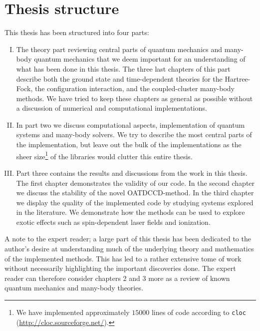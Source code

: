     \section{Thesis structure}
        This thesis has been structured into four parts:
        \begin{enumerate}[I.]
            \item The theory part reviewing central parts of quantum mechanics
                and many-body quantum mechanics that we deem important for an
                understanding of what has been done in this thesis.
                The three last chapters of this part describe both the ground
                state and time-dependent theories for the Hartree-Fock, the
                configuration interaction, and the coupled-cluster many-body
                methods.
                We have tried to keep these chapters as general as possible
                without a discussion of numerical and computational
                implementations.
            \item In part two we discuss computational aspects, implementation
                of quantum systems and many-body solvers.
                We try to describe the most central parts of the implementation,
                but leave out the bulk of the implementations as the sheer
                size\footnote{%
                    We have implemented approximately $15000$ lines of code
                    according to \texttt{cloc}
                    (\url{http://cloc.sourceforge.net/}).
                }
                of the libraries would clutter this entire thesis.
            \item Part three contains the results and discussions from the work
                in this thesis.
                The first chapter demonstrates the validity of our code.
                In the second chapter we discuss the stability of the novel
                OATDCCD-method.
                In the third chapter we display the quality of the implemented
                code by studying systems explored in the literature.
                We demonstrate how the methods can be used to explore exotic
                effects such as spin-dependent laser fields and ionization.
        \end{enumerate}
        A note to the expert reader; a large part of this thesis has been
        dedicated to the author's desire at understanding much of the underlying
        theory and mathematics of the implemented methods.
        This has led to a rather extensive tome of work without necessarily
        highlighting the important discoveries done.
        The expert reader can therefore consider chapters 2 and 3 more as a
        review of known quantum mechanics and many-body theories.

